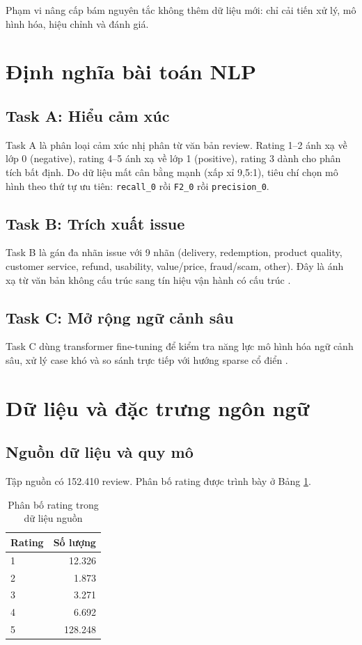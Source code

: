 ﻿\documentclass[12pt,a4paper]{article}
\begin{document}
Phạm vi nâng cấp bám nguyên tắc không thêm dữ liệu mới: chỉ cải tiến xử lý, mô hình hóa, hiệu chỉnh và đánh giá.

\section{Định nghĩa bài toán NLP}
\subsection{Task A: Hiểu cảm xúc}
Task A là phân loại cảm xúc nhị phân từ văn bản review. Rating 1--2 ánh xạ về lớp 0 (negative), rating 4--5 ánh xạ về lớp 1 (positive), rating 3 dành cho phân tích bất định. Do dữ liệu mất cân bằng mạnh (xấp xỉ 9,5:1), tiêu chí chọn mô hình theo thứ tự ưu tiên: \texttt{recall\_0} rồi \texttt{F2\_0} rồi \texttt{precision\_0}.

\subsection{Task B: Trích xuất issue}
Task B là gán đa nhãn issue với 9 nhãn (delivery, redemption, product quality, customer service, refund, usability, value/price, fraud/scam, other). Đây là ánh xạ từ văn bản không cấu trúc sang tín hiệu vận hành có cấu trúc \cite{tsoumakas2011,zhang2014}.

\subsection{Task C: Mở rộng ngữ cảnh sâu}
Task C dùng transformer fine-tuning để kiểm tra năng lực mô hình hóa ngữ cảnh sâu, xử lý case khó và so sánh trực tiếp với hướng sparse cổ điển \cite{vaswani2017,devlin2019}.

\section{Dữ liệu và đặc trưng ngôn ngữ}
\subsection{Nguồn dữ liệu và quy mô}
Tập nguồn có 152.410 review. Phân bố rating được trình bày ở Bảng \ref{tab:rating_distribution_vi}.

\begin{table}[H]
\centering
\caption{Phân bố rating trong dữ liệu nguồn}
\label{tab:rating_distribution_vi}
\begin{tabular}{lr}
\toprule
Rating & Số lượng \\
\midrule
1 & 12.326 \\
2 & 1.873 \\
3 & 3.271 \\
4 & 6.692 \\
5 & 128.248 \\
\bottomrule
\end{tabular}
\end{table}
\end{document}
